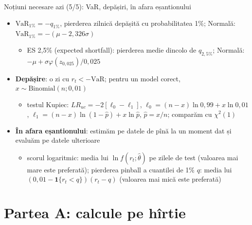 \begin{frame}{Noțiuni necesare azi (5/5): VaR, depășiri, în afara eșantionului}
\itemsize{\footnotesize}
\begin{itemize}
    \item $\mathrm{VaR}_{1\%} = -q_{1\%}$, pierderea zilnică depășită cu probabilitatea 1\%; Normală: $\mathrm{VaR}_{1\%} = -(\mu - 2{,}326\sigma)$
    \begin{itemize}
        \item ES 2,5\% (expected shortfall): pierderea medie dincolo de $q_{2{,}5\%}$; Normală: $-\mu + \sigma\varphi(z_{0{,}025})/0{,}025$
    \end{itemize}
    \item \textbf{Depășire}: o zi cu $r_t < -\mathrm{VaR}$; pentru un model corect, $x \sim \mathrm{Binomial}(n; 0{,}01)$
    \begin{itemize}
        \item testul Kupiec: $LR_{uc} = -2[\ell_0 - \ell_1]$, $\ell_0 = (n - x)\ln 0{,}99 + x\ln 0{,}01$, $\ell_1 = (n - x)\ln(1 - \hat p) + x\ln\hat p$, $\hat p = x/n$; comparăm cu $\chi^2(1)$
    \end{itemize}
    \item \textbf{În afara eșantionului}: estimăm pe datele de pînă la un moment dat și evaluăm pe datele ulterioare
    \begin{itemize}
        \item scorul logaritmic: media lui $\ln f(r_t; \hat\theta)$ pe zilele de test (valoarea mai mare este preferată); pierderea pinball a cuantilei de 1\% $q$: media lui $(0{,}01 - \mathbf{1}\{r_t < q\})(r_t - q)$ (valoarea mai mică este preferată)
    \end{itemize}
\end{itemize}
\end{frame}


\section{Partea A: calcule pe hîrtie}

